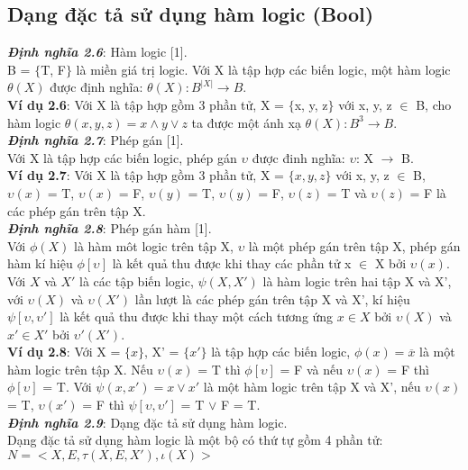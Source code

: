 \documentclass[a4paper,13pt,oneside,openany]{book}
\begin{document}
\begin{flushleft}
		\section{Dạng đặc tả sử dụng hàm logic (Bool)}
		\textbf{\textit{Định nghĩa 2.6}}: Hàm logic [1].\\
		B = $\{$T, F$\}$ là miền giá trị logic. Với X là tập hợp các biến logic, một hàm logic $\theta(X)$ được định nghĩa: $\theta(X): B^{|X|} \rightarrow B$.\\
		\textbf{Ví dụ 2.6}: Với X là tập hợp gồm 3 phần tử, X = $\{$x, y, z$\}$ với x, y, z $\in$ B, cho hàm logic $\theta(x, y, z) = x \land y \lor z$ ta được một ánh xạ $\theta(X): B^3 \rightarrow B $.\\
		\textbf{\textit{Định nghĩa 2.7}}: Phép gán [1].\\
		Với X là tập hợp các biến logic, phép gán $\upsilon$ được đinh nghĩa: $\upsilon$: X $\rightarrow$ B.\\
		\textbf{Ví dụ 2.7}: Với X là tập hợp gồm 3 phần tử, X = $\{x, y, z\}$ với x, y, z $\in$ B, $\upsilon(x)$ = T, $\upsilon(x)$ = F, $\upsilon(y)$ = T, $\upsilon(y)$ = F, $\upsilon(z)$ = T và $\upsilon(z)$ = F là các phép gán trên tập X.\\
		\textbf{\textit{Định nghĩa 2.8}}: Phép gán hàm [1].\\
		Với $\phi(X)$ là hàm môt logic trên tập X, $\upsilon$ là một phép gán trên tập X, phép gán hàm kí hiệu $\phi[\upsilon]$ là kết quả thu được khi thay các phần tử x $\in$ X bởi $\upsilon(x)$.
		Với $X$ và $X'$ là các tập biến logic, $\psi(X, X')$ là hàm logic trên hai tập X và X', với $\upsilon(X)$ và $\upsilon(X')$ lần lượt là các phép gán trên tập X và X', kí hiệu $\psi[\upsilon, \upsilon']$ là kết quả thu được khi thay một cách tương ứng $x \in X$ bởi $\upsilon(X)$ và $x' \in X'$ bởi $\upsilon'(X')$.\\
		\textbf{Ví dụ 2.8}: Với X = $\{x\}$, X' = $\{x'\}$ là tập hợp các biến logic, $\phi(x) = \overline{x}$ là một hàm logic trên tập X. Nếu $\upsilon(x)$ = T thì $\phi[\upsilon]$ = F và nếu $\upsilon(x)$ = F thì $\phi[\upsilon]$ = T. Với $\psi(x, x') = x \lor x'$ là một hàm logic trên tập X và X', nếu $\upsilon(x)$ = T, $\upsilon(x')$ = F thì $\psi[\upsilon, \upsilon']$ = T $\lor$ F = T.\\
		\textbf{\textit{Định nghĩa 2.9}}: Dạng đặc tả sử dụng hàm logic.\\
		Dạng đặc tả sử dụng hàm logic là một bộ có thứ tự gồm 4 phần tử:\\
		$N = <X, E, \tau(X, E, X'), \iota(X)>$\\

\end{flushleft}
\end{document}
